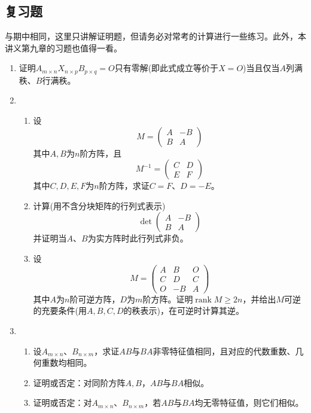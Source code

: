\documentclass[a4paper,UTF8,fontset=windows]{ctexart}
\DeclareMathOperator{\rank}{rank}
\newcommand*{\note}{\noindent *}
\begin{document}
\subsection{复习题}
\note 与期中相同，这里只讲解证明题，但请务必对常考的计算进行一些练习。此外，本讲义第九章的习题也值得一看。
\begin{enumerate}
    \item 证明$A_{m\times n}X_{n\times p}B_{p\times q}=O$只有零解(即此式成立等价于$X=O$)当且仅当$A$列满秩、$B$行满秩。

    \item 
    \begin{enumerate}
        \item 设
        $$M=\begin{pmatrix}A&-B\\B&A\end{pmatrix}$$
        其中$A,B$为$n$阶方阵，且
        $$M^{-1}=\begin{pmatrix}C&D\\E&F\end{pmatrix}$$
        其中$C,D,E,F$为$n$阶方阵，求证$C=F$、$D=-E$。  

        \item 计算(用不含分块矩阵的行列式表示)
        $$\det\begin{pmatrix}A&-B\\B&A\end{pmatrix}$$
        并证明当$A$、$B$为实方阵时此行列式非负。

        \item 设
        $$M=\begin{pmatrix}A&B&O\\C&D&C\\O&-B&A\end{pmatrix}$$
        其中$A$为$n$阶可逆方阵，$D$为$m$阶方阵。证明$\rank M\ge 2n$，并给出$M$可逆的充要条件(用$A,B,C,D$的秩表示)，在可逆时计算其逆。
    \end{enumerate}

    \item 
    \begin{enumerate}
        \item 设$A_{m\times n}$、$B_{n\times m}$，求证$AB$与$BA$非零特征值相同，且对应的代数重数、几何重数均相同。
        \item 证明或否定：对同阶方阵$A,B$，$AB$与$BA$相似。
        \item 证明或否定：对$A_{m\times n}$、$B_{n\times m}$，若$AB$与$BA$均无零特征值，则它们相似。
    \end{enumerate}


\end{enumerate}
\end{document}
